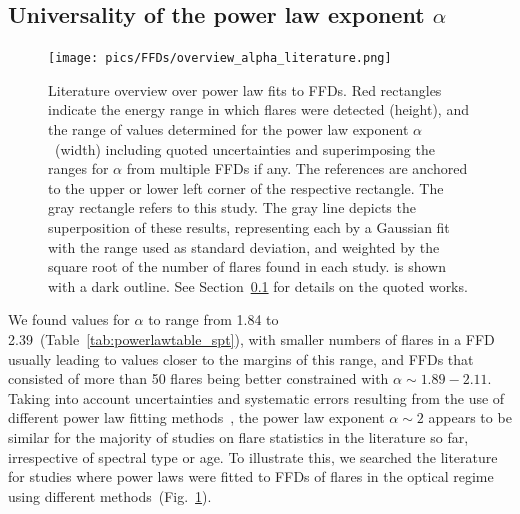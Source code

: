 \documentclass{aa}
\begin{document}
\subsection{Universality of the power law exponent $\alpha$}
\label{sec:sec:universal}
   \begin{figure}[t!]
   \centering
            \texttt{[image: pics/FFDs/overview\_alpha\_literature.png]}
         \caption{Literature overview over power law fits to FFDs. Red rectangles indicate the energy range in which flares were detected (height), and the range of values determined for the power law exponent $\alpha$~(width) including quoted uncertainties and superimposing the ranges for $\alpha$ from multiple FFDs if any. The references are anchored to the upper or lower left corner of the respective rectangle. The gray rectangle refers to this study. The gray line depicts the superposition of these results, representing each by a Gaussian fit with the range used as standard deviation, and weighted by the square root of the number of flares found in each study.  is shown with a dark outline. See Section~\ref{sec:sec:universal} for details on the quoted works.
}
          \label{fig:powerlaw_literature}
     
   \end{figure}
We found values for $\alpha$ to range from 1.84 to 2.39~(Table~\ref{tab:powerlawtable_spt}), with smaller numbers of flares in a FFD usually leading to values closer to the margins of this range, and FFDs that consisted of more than 50 flares being better constrained with $\alpha\sim 1.89-2.11$.
Taking into account uncertainties and systematic errors resulting from the use of different power law fitting methods~\citep{maschberger2009}, the power law exponent $\alpha\sim 2$ appears to be similar for the majority of studies on flare statistics in the literature so far, irrespective of spectral type or age. To illustrate this, we searched the literature for studies where power laws were fitted to FFDs of flares in the optical regime using different methods~(Fig.~\ref{fig:powerlaw_literature}). 
\\
\end{document}

